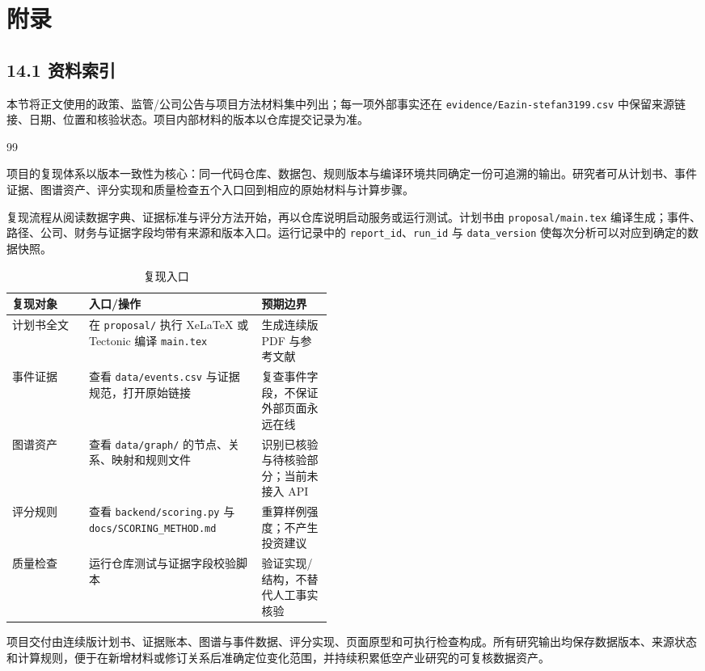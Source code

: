 \clearpage
\section{附录}
\subsection*{14.1 资料索引}\label{page:49}
本节将正文使用的政策、监管/公司公告与项目方法材料集中列出；每一项外部事实还在 \texttt{evidence/Eazin-stefan3199.csv} 中保留来源链接、日期、位置和核验状态。项目内部材料的版本以仓库提交记录为准。
\renewcommand{\refname}{参考文献}
\begin{thebibliography}{99}


\end{thebibliography}


项目的复现体系以版本一致性为核心：同一代码仓库、数据包、规则版本与编译环境共同确定一份可追溯的输出。研究者可从计划书、事件证据、图谱资产、评分实现和质量检查五个入口回到相应的原始材料与计算步骤。

复现流程从阅读数据字典、证据标准与评分方法开始，再以仓库说明启动服务或运行测试。计划书由 \texttt{proposal/main.tex} 编译生成；事件、路径、公司、财务与证据字段均带有来源和版本入口。运行记录中的 \texttt{report\_id}、\texttt{run\_id} 与 \texttt{data\_version} 使每次分析可以对应到确定的数据快照。

\begin{table}[htbp]
\centering
\caption{复现入口}
\label{tab:wty-reproducibility}
\small
\begin{tabularx}{\linewidth}{p{0.24\linewidth}X p{0.22\linewidth}}
\toprule
复现对象 & 入口/操作 & 预期边界 \\
\midrule
计划书全文 & 在 \texttt{proposal/} 执行 XeLaTeX 或 Tectonic 编译 \texttt{main.tex} & 生成连续版 PDF 与参考文献 \\
事件证据 & 查看 \texttt{data/events.csv} 与证据规范，打开原始链接 & 复查事件字段，不保证外部页面永远在线 \\
图谱资产 & 查看 \texttt{data/graph/} 的节点、关系、映射和规则文件 & 识别已核验与待核验部分；当前未接入 API \\
评分规则 & 查看 \texttt{backend/scoring.py} 与 \texttt{docs/SCORING\_METHOD.md} & 重算样例强度；不产生投资建议 \\
质量检查 & 运行仓库测试与证据字段校验脚本 & 验证实现/结构，不替代人工事实核验 \\
\bottomrule
\end{tabularx}
\end{table}

项目交付由连续版计划书、证据账本、图谱与事件数据、评分实现、页面原型和可执行检查构成。所有研究输出均保存数据版本、来源状态和计算规则，便于在新增材料或修订关系后准确定位变化范围，并持续积累低空产业研究的可复核数据资产。




